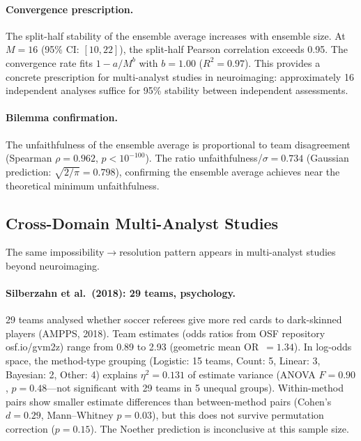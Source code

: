 \documentclass[11pt,a4paper]{article}
\begin{document}
\paragraph{Convergence prescription.}
The split-half stability of the ensemble average increases with ensemble size.  At $M = 16$ (95\% CI: $[10, 22]$), the split-half Pearson correlation exceeds 0.95.  The convergence rate fits $1 - a/M^b$ with $b = 1.00$ ($R^2 = 0.97$).  This provides a concrete prescription for multi-analyst studies in neuroimaging: approximately 16 independent analyses suffice for 95\% stability between independent assessments.

\paragraph{Bilemma confirmation.}
The unfaithfulness of the ensemble average is proportional to team disagreement (Spearman $\rho = 0.962$, $p < 10^{-100}$).  The ratio unfaithfulness/$\sigma = 0.734$ (Gaussian prediction: $\sqrt{2/\pi} = 0.798$), confirming the ensemble average achieves near the theoretical minimum unfaithfulness.

\subsection{Cross-Domain Multi-Analyst Studies}
\label{sec:multi-analyst-cross-domain}

The same impossibility$\to$resolution pattern appears in multi-analyst studies beyond neuroimaging.

\paragraph{Silberzahn et al.\ (2018): 29 teams, psychology.}
29 teams analysed whether soccer referees give more red cards to dark-skinned players (AMPPS, 2018).  Team estimates (odds ratios from OSF repository osf.io/gvm2z) range from 0.89 to 2.93 (geometric mean OR~$= 1.34$).  In log-odds space, the method-type grouping (Logistic: 15 teams, Count: 5, Linear: 3, Bayesian: 2, Other: 4) explains $\eta^2 = 0.131$ of estimate variance (ANOVA $F = 0.90$, $p = 0.48$---not significant with 29 teams in 5 unequal groups).  Within-method pairs show smaller estimate differences than between-method pairs (Cohen's $d = 0.29$, Mann--Whitney $p = 0.03$), but this does not survive permutation correction ($p = 0.15$).  The Noether prediction is inconclusive at this sample size.
\end{document}

